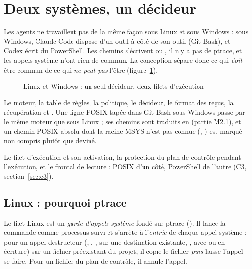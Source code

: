 \section{Deux systèmes, un décideur}
\label{sec:deux-os}

Les agents ne travaillent pas de la même façon sous Linux et sous Windows : sous Windows,
Claude Code dispose d'un outil  à côté de son outil  (Git Bash), et
Codex écrit du PowerShell. Les chemins s'écrivent  ou , il
n'y a pas de ptrace, et les appels système n'ont rien de commun. La conception sépare donc
ce qui \emph{doit} être commun de ce qui \emph{ne peut pas} l'être
(figure~\ref{fig:os}).

\begin{figure}[htbp]
\centering

\caption{Linux et Windows : un seul décideur, deux filets d'exécution}
\label{fig:os}
\end{figure}

\begin{description}[style=nextline,leftmargin=0.6cm,font=\sffamily\bfseries]
  \item[Commun]
    Le moteur, la table de règles, la politique, le décideur, le format des reçus, la
    récupération et . Une ligne POSIX tapée dans Git Bash sous Windows passe par le
    même moteur que sous Linux ; ses chemins  sont traduits en
     (partie M2.1), et un chemin POSIX absolu dont la racine MSYS
    n'est pas connue (, ) est marqué non compris plutôt que deviné.
  \item[Propre à chaque système]
    Le filet d'exécution et son activation, la protection du plan de contrôle pendant
    l'exécution, et le frontal de lecture : POSIX d'un côté, PowerShell de l'autre (C3,
    section~\ref{sec:c3}).
\end{description}

\subsection{Linux : pourquoi ptrace}
Le filet Linux est un \emph{garde d'appels système} fondé sur ptrace
(). Il lance la commande comme processus suivi et s'arrête à
l'\emph{entrée} de chaque appel système ; pour un appel destructeur (,
, ,  sur une destination existante, ,
 avec  ou en écriture) sur un fichier préexistant du projet, il copie
le fichier \emph{puis} laisse l'appel se faire. Pour un fichier du plan de contrôle, il annule
l'appel.

